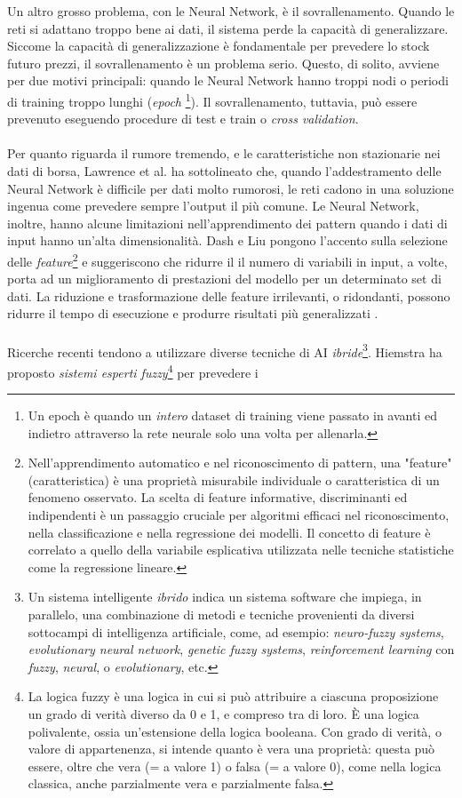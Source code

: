 \documentclass[a4paper,12pt]{report}
\begin{document}
Un altro grosso problema, con le Neural Network, è il sovrallenamento. Quando le reti si adattano troppo bene ai dati, il sistema perde la capacità di generalizzare. Siccome la capacità di generalizzazione è fondamentale per prevedere lo stock futuro prezzi, il sovrallenamento è un problema serio. Questo, di solito, avviene per due motivi principali: quando le Neural Network hanno troppi nodi o periodi di training troppo lunghi (\textit{epoch} \footnote{Un epoch è quando un \textit{intero} dataset di training viene passato in avanti ed indietro attraverso la rete neurale solo una volta per allenarla.}). Il sovrallenamento, tuttavia, può essere prevenuto eseguendo procedure di test e train o \textit{cross validation}.\\~\\Per quanto riguarda il rumore tremendo, e le caratteristiche non stazionarie nei dati di borsa, Lawrence et al. \cite{nn1} ha sottolineato che, quando l'addestramento delle Neural Network è difficile per dati molto rumorosi, le reti cadono in una soluzione ingenua come prevedere sempre l'output il più comune. Le Neural Network, inoltre, hanno alcune limitazioni nell'apprendimento dei pattern quando i dati di input hanno un'alta dimensionalità. Dash e Liu \cite{2} pongono l'accento sulla selezione delle \textit{feature}\footnote{Nell'apprendimento automatico e nel riconoscimento di pattern, una "feature" (caratteristica) è una proprietà misurabile individuale o caratteristica di un fenomeno osservato. La scelta di feature informative, discriminanti ed indipendenti è un passaggio cruciale per algoritmi efficaci nel riconoscimento, nella classificazione e nella regressione dei modelli. Il concetto di feature è correlato a quello della variabile esplicativa utilizzata nelle tecniche statistiche come la regressione lineare.} e suggeriscono che ridurre il il numero di variabili in input, a volte, porta ad un miglioramento di prestazioni del modello per un determinato set di dati. La riduzione e trasformazione delle feature irrilevanti, o ridondanti, possono ridurre il tempo di esecuzione e produrre risultati più generalizzati \cite{2}.\\~\\ Ricerche recenti tendono a utilizzare diverse tecniche di AI \textit{ibride}\footnote{Un sistema intelligente \textit{ibrido} indica un sistema software che impiega, in parallelo, una combinazione di metodi e tecniche provenienti da diversi sottocampi di intelligenza artificiale, come, ad esempio: \textit{neuro-fuzzy systems}, \textit{evolutionary neural network}, \textit{genetic fuzzy systems}, \textit{reinforcement learning} con \textit{fuzzy}, \textit{neural}, o \textit{evolutionary}, etc.}. Hiemstra \cite{11} ha proposto \textit{sistemi esperti fuzzy}\footnote{La logica fuzzy è una logica in cui si può attribuire a ciascuna proposizione un grado di verità diverso da 0 e 1, e compreso tra di loro. È una logica polivalente, ossia un'estensione della logica booleana. Con grado di verità, o valore di appartenenza, si intende quanto è vera una proprietà: questa può essere, oltre che vera (= a valore 1) o falsa (= a valore 0), come nella logica classica, anche parzialmente vera e parzialmente falsa.} per prevedere i 
\end{document}
